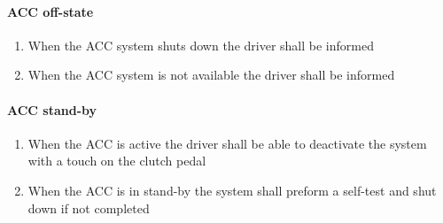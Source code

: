 \paragraph{ACC off-state}
\begin{enumerate}
    \item When the ACC system shuts down the driver shall be informed
    \item When the ACC system is not available the driver shall be informed
\end{enumerate}

\paragraph{ACC stand-by}
\begin{enumerate}
    \item When the ACC is active the driver shall be able to deactivate the system with a touch on the clutch pedal
    \item When the ACC is in stand-by the system shall preform a self-test and shut down if not completed
\end{enumerate}

